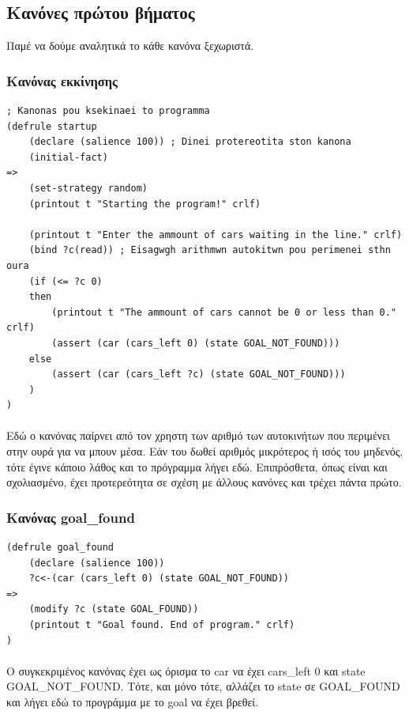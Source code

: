 \documentclass{article}
\begin{document}
    \newpage
    \subsection{Κανόνες πρώτου βήματος}
    Παμέ να δούμε αναλητικά το κάθε κανόνα ξεχωριστά.

    \subsubsection{Κανόνας εκκίνησης}
    \begin{lstlisting}[caption=Κανόνας εκκίνησης]
; Kanonas pou ksekinaei to programma
(defrule startup
    (declare (salience 100)) ; Dinei protereotita ston kanona
    (initial-fact)
=>
    (set-strategy random)
    (printout t "Starting the program!" crlf)

    (printout t "Enter the ammount of cars waiting in the line." crlf)
    (bind ?c(read)) ; Eisagwgh arithmwn autokitwn pou perimenei sthn oura
    (if (<= ?c 0)
    then
        (printout t "The ammount of cars cannot be 0 or less than 0." crlf)
        (assert (car (cars_left 0) (state GOAL_NOT_FOUND)))
    else
        (assert (car (cars_left ?c) (state GOAL_NOT_FOUND)))
    )
)
    \end{lstlisting}

    \paragraph{}
    Εδώ ο κανόνας παίρνει από τον χρηστη των αριθμό των αυτοκινήτων που περιμένει στην ουρά για να μπουν μέσα.
    Εάν του δωθεί αριθμός μικρότερος ή ισός του μηδενός, τότε έγινε κάποιο λάθος και το πρόγραμμα λήγει εδώ.
    Επιπρόσθετα, όπως είναι και σχολιασμένο, έχει προτερεότητα σε σχέση με άλλους κανόνες και τρέχει πάντα πρώτο.

    \subsubsection{Κανόνας goal\_found}
    \begin{lstlisting}[caption=Κανόνας goal\_found]
(defrule goal_found
    (declare (salience 100))
    ?c<-(car (cars_left 0) (state GOAL_NOT_FOUND))
=>
    (modify ?c (state GOAL_FOUND))
    (printout t "Goal found. End of program." crlf)
)
    \end{lstlisting}

    \paragraph{}
    Ο συγκεκριμένος κανόνας έχει ως όρισμα το car να έχει cars\_left 0 και state GOAL\_NOT\_FOUND. Τότε, και μόνο τότε, αλλάζει το state
    σε GOAL\_FOUND και λήγει εδώ το προγράμμα με το goal να έχει βρεθεί.
\end{document}
